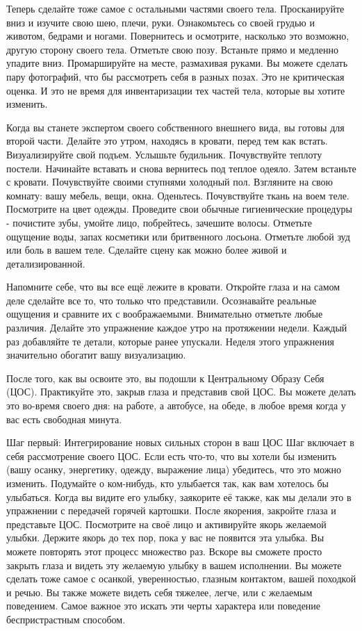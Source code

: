 \documentclass[10pt, fleqn]{article}
\begin{document}
Теперь сделайте тоже самое с остальными частями своего тела. Просканируйте вниз и изучите свою шею, плечи, руки. Ознакомьтесь со своей грудью и животом, бедрами и ногами. Повернитесь и осмотрите, насколько это возможно, другую сторону своего тела. Отметьте свою позу. Встаньте прямо и медленно упадите вниз. Промаршируйте на месте, размахивая руками. Вы можете сделать пару фотографий, что бы рассмотреть себя в разных позах. Это не критическая оценка. И это не время для инвентаризации тех частей тела, которые вы хотите изменить.

Когда вы станете экспертом своего собственного внешнего вида, вы готовы для второй части. Делайте это утром, находясь в кровати, перед тем как встать. Визуализируйте свой подъем. Услышьте будильник. Почувствуйте теплоту постели. Начинайте вставать и снова вернитесь под теплое одеяло. Затем встаньте с кровати. Почувствуйте своими ступнями холодный пол. Взгляните на свою комнату: вашу мебель, вещи, окна. Оденьтесь. Почувствуйте ткань на воем теле. Посмотрите на цвет одежды. Проведите свои обычные гигиенические процедуры - почистите зубы, умойте лицо, побрейтесь, зачешите волосы. Отметьте ощущение воды, запах косметики или бритвенного лосьона. Отметьте любой зуд или боль в вашем теле. Сделайте сцену как можно более живой и детализированной.

Напомните себе, что вы все ещё лежите в кровати. Откройте глаза и на самом деле сделайте все то, что только что представили. Осознавайте реальные ощущения и сравните их с воображаемыми. Внимательно отметьте любые различия. Делайте это упражнение каждое утро на протяжении недели. Каждый раз добавляйте те детали, которые ранее упускали. Неделя этого упражнения значительно обогатит вашу визуализацию.

После того, как вы освоите это, вы подошли к Центральному Образу Себя (ЦОС). Практикуйте это, закрыв глаза и представив свой ЦОС. Вы можете делать это во-время своего дня: на работе, а автобусе, на обеде, в любое время когда у вас есть свободная минута.


Шаг первый: Интегрирование новых сильных сторон в ваш ЦОС
Шаг включает в себя рассмотрение своего ЦОС. Если есть что-то, что вы хотели бы изменить (вашу осанку, энергетику, одежду, выражение лица) убедитесь, что это можно изменить. Подумайте о ком-нибудь, кто улыбается так, как вам хотелось бы улыбаться. Когда вы видите его улыбку, заякорите её также, как мы делали это в упражнении с передачей горячей картошки. После якорения, закройте глаза и представьте ЦОС. Посмотрите на своё лицо и активируйте якорь желаемой улыбки. Держите якорь до тех пор, пока у вас не появится эта улыбка. Вы можете повторять этот процесс множество раз. Вскоре вы сможете просто закрыть глаза и видеть эту желаемую улыбку в вашем исполнении. Вы можете сделать тоже самое с осанкой, уверенностью, глазным контактом, вашей походкой и речью. Вы также можете видеть себя тяжелее, легче, или с желаемым поведением. Самое важное это искать эти черты характера или поведение беспристрастным способом.
\end{document}
